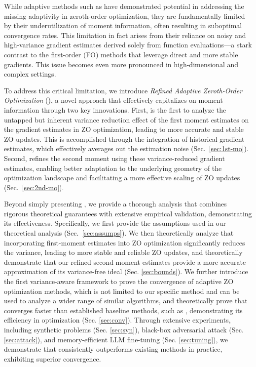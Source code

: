 While adaptive methods such as \base{} \citep{zo-adamm, nazari2020adaptive} have demonstrated potential in addressing the missing adaptivity in zeroth-order optimization, they are fundamentally limited by their underutilization of moment information, often resulting in suboptimal convergence rates. This limitation in fact arises from their reliance on noisy and high-variance gradient estimates derived solely from function evaluations—a stark contrast to the first-order (FO) methods that leverage direct and more stable gradients. This issue becomes even more pronounced in high-dimensional and complex settings.

To address this critical limitation, we introduce \textit{Refined Adaptive Zeroth-Order Optimization} (\ours{}), a novel approach that effectively capitalizes on moment information through two key innovations. First, \ours{} is the first to analyze the untapped but inherent variance reduction effect of the first moment estimates on the gradient estimates in ZO optimization, leading to more accurate and stable ZO updates. This is accomplished through the integration of historical gradient estimates, which effectively averages out the estimation noise (Sec.~\ref{sec:1st-mo}). Second, \ours{} refines the second moment using these variance-reduced gradient estimates, enabling better adaptation to the underlying geometry of the optimization landscape and facilitating a more effective scaling of ZO updates (Sec.~\ref{sec:2nd-mo}).

Beyond simply presenting \ours{}, we provide a thorough analysis that combines rigorous theoretical guarantees with extensive empirical validation, demonstrating its effectiveness. Specifically, we first provide the assumptions used in our theoretical analysis (Sec.~\ref{sec:assumps}). We then theoretically analyze that incorporating first-moment estimates into ZO optimization significantly reduces the variance, leading to more stable and reliable ZO updates, and theoretically demonstrate that our refined second moment estimates provide a more accurate approximation of its variance-free ideal (Sec. \ref{sec:bounds}). We further introduce the first variance-aware framework to prove the convergence of adaptive ZO optimization methods, which is not limited to our specific method and can be used to analyze a wider range of similar algorithms, and theoretically prove that \ours{} converges faster than established baseline methods, such as \base{}, demonstrating its efficiency in optimization (Sec. \ref{sec:conv}). Through extensive experiments, including synthetic problems (Sec. \ref{sec:syn}), black-box adversarial attack (Sec. \ref{sec:attack}), and memory-efficient LLM fine-tuning (Sec. \ref{sec:tuning}), we demonstrate that \ours{} consistently outperforms existing methods in practice, exhibiting superior convergence.


